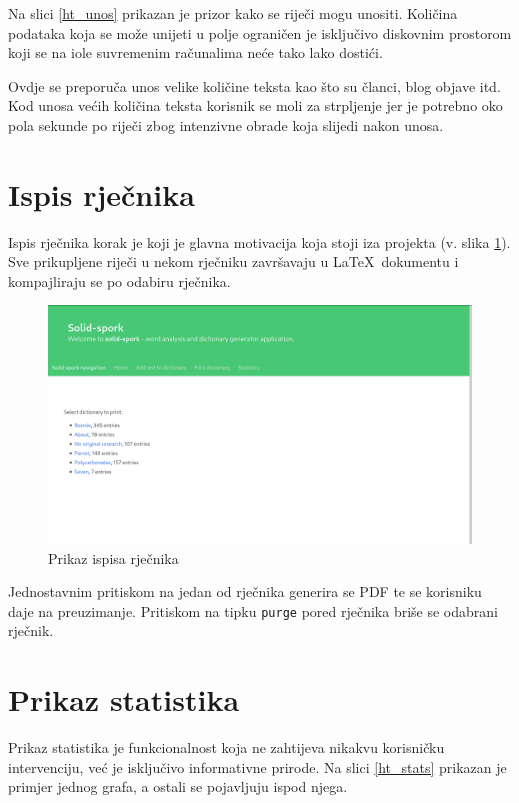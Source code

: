 \documentclass{foi}
\begin{document}
Na slici \ref{ht_unos} prikazan je prizor kako se riječi mogu unositi. Količina
podataka koja se može unijeti u polje ograničen je isključivo diskovnim
prostorom koji se na iole suvremenim računalima neće tako lako dostići.

Ovdje se preporuča unos velike količine teksta kao što su članci, blog objave
itd. Kod unosa većih količina teksta korisnik se moli za strpljenje jer je
potrebno oko pola sekunde po riječi zbog intenzivne obrade koja slijedi
nakon unosa.

\section{Ispis rječnika}

Ispis rječnika korak je koji je glavna motivacija koja stoji iza projekta (v.
slika \ref{ht_print}). Sve prikupljene riječi u nekom rječniku završavaju u
\LaTeX\ dokumentu i kompajliraju se po odabiru rječnika.

\begin{figure}[!h]
	\includegraphics[width=\textwidth]{slike/solid-spork-print.png}
	\caption{Prikaz ispisa rječnika}
	\label{ht_print}
\end{figure}

Jednostavnim pritiskom na jedan od rječnika generira se PDF te se korisniku
daje na preuzimanje. Pritiskom na tipku \texttt{purge} pored rječnika briše se
odabrani rječnik.

\section{Prikaz statistika}

Prikaz statistika je funkcionalnost koja ne zahtijeva nikakvu korisničku
intervenciju, već je isključivo informativne prirode. Na slici \ref{ht_stats}
prikazan je primjer jednog grafa, a ostali se pojavljuju ispod njega.
\end{document}
